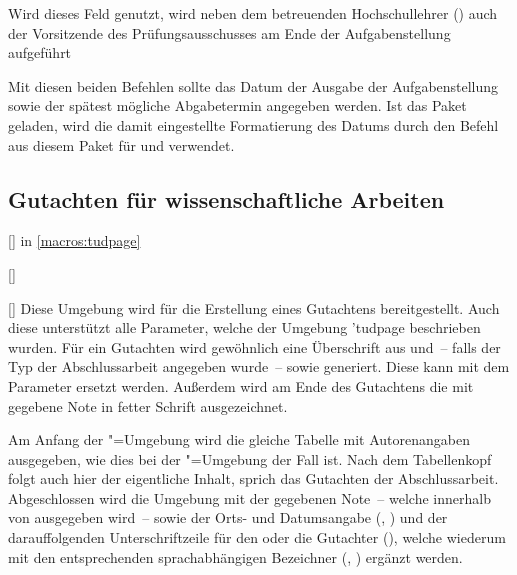 \documentclass[%
  english,ngerman,%
  headings=optiontoheadandtoc,captions=tableheading,numbers=noenddot,%
  chapterpage,cdfoot,%
]{tudscrman}
\begin{document}
\begin{Declaration}{}
\printdeclarationlist%
Wird dieses Feld genutzt, wird neben dem betreuenden Hochschullehrer 
() auch der Vorsitzende des Prüfungsausschusses am Ende der 
Aufgabenstellung aufgeführt
\end{Declaration}

\begin{Declaration}{}
\begin{Declaration}{}
\printdeclarationlist%
Mit diesen beiden Befehlen sollte das Datum der Ausgabe der Aufgabenstellung 
sowie der spätest mögliche  Abgabetermin angegeben werden. Ist das Paket 
 geladen, wird die damit eingestellte Formatierung des Datums 
durch den Befehl  aus diesem Paket für  und 
 verwendet.
\end{Declaration}
\end{Declaration}

\subsection{Gutachten für wissenschaftliche Arbeiten}
\begin{Declaration}{[]}{%
   in \autoref{macros:tudpage}
}
\begin{Declaration}{[]}
\begin{Declaration}{[]}
\printdeclarationlist%
%
Diese Umgebung wird für die Erstellung eines Gutachtens bereitgestellt. Auch 
diese unterstützt alle Parameter, welche der Umgebung \Environment'{tudpage} 
beschrieben wurden. Für ein Gutachten wird gewöhnlich eine Überschrift aus 
 und~-- falls der Typ der Abschlussarbeit angegeben 
wurde~--  sowie  generiert. Diese kann mit 
dem Parameter  ersetzt werden. Außerdem 
wird am Ende des Gutachtens die mit  
gegebene Note in fetter Schrift ausgezeichnet.

Am Anfang der "=Umgebung wird die gleiche Tabelle mit 
Autorenangaben ausgegeben, wie dies bei der "=Umgebung der 
Fall ist. Nach dem Tabellenkopf folgt auch hier der eigentliche Inhalt, sprich 
das Gutachten der Abschlussarbeit. Abgeschlossen wird die Umgebung mit der 
gegebenen Note~-- welche innerhalb von  ausgegeben wird~-- sowie 
der Orts- und Datumsangabe (, ) und der darauffolgenden 
Unterschriftzeile für den oder die Gutachter (), welche wiederum 
mit den entsprechenden sprachabhängigen Bezeichner (, 
) ergänzt werden.
\end{Declaration}
\end{Declaration}
\end{Declaration}
\end{document}
